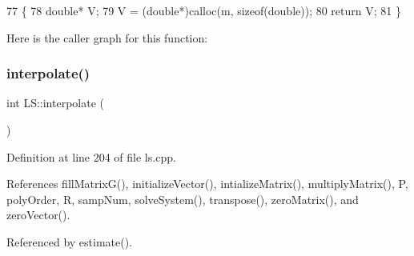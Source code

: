 \begin{DoxyCode}
77                                    \{
78     \textcolor{keywordtype}{double}* V;
79     V = (\textcolor{keywordtype}{double}*)calloc(m, \textcolor{keyword}{sizeof}(\textcolor{keywordtype}{double}));
80     \textcolor{keywordflow}{return} V;
81 \}
\end{DoxyCode}
Here is the caller graph for this function\+:
\mbox{\label{class_l_s_a1657c109024e802aee886d293778079f}} 
\subsubsection{\texorpdfstring{interpolate()}{interpolate()}}
{\footnotesize\ttfamily int L\+S\+::interpolate (\begin{DoxyParamCaption}{ }\end{DoxyParamCaption})\hspace{0.3cm}{\ttfamily [private]}}



Definition at line 204 of file ls.\+cpp.



References fill\+Matrix\+G(), initialize\+Vector(), intialize\+Matrix(), multiply\+Matrix(), P, poly\+Order, R, samp\+Num, solve\+System(), transpose(), zero\+Matrix(), and zero\+Vector().



Referenced by estimate().


